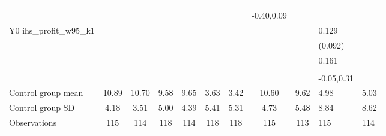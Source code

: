 \begin{table}[!h]
\begin{adjustbox}{width=\columnwidth,center}
\begin{tabular}{l*{8}{c}}
                    &                     &                     &                     &                     &                     &                     &                     &                     &                     &                     \\
                    &                     &                     &                     &                     &                     &                     &  -0.40,0.09         &                     &                     &                     \\
Y0 ihs\_profit\_w95\_k1&                     &                     &                     &                     &                     &                     &                     &                     &       0.129         &                     \\
                    &                     &                     &                     &                     &                     &                     &                     &                     &     (0.092)         &                     \\
                    &                     &                     &                     &                     &                     &                     &                     &                     &       0.161         &                     \\
                    &                     &                     &                     &                     &                     &                     &                     &                     &                     &                     \\
                    &                     &                     &                     &                     &                     &                     &                     &                     &  -0.05,0.31         &                     \\
\hline
Control group mean  &       10.89         &       10.70         &        9.58         &        9.65         &        3.63         &        3.42         &       10.60         &        9.62         &        4.98         &        5.03         \\
Control group SD    &        4.18         &        3.51         &        5.00         &        4.39         &        5.41         &        5.31         &        4.73         &        5.48         &        8.84         &        8.62         \\
Observations        &         115         &         114         &         118         &         114         &         118         &         118         &         115         &         113         &         115         &         114         \\

\end{tabular}
\end{adjustbox}
\end{table}
